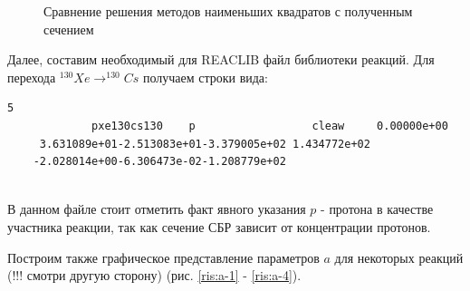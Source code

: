 \documentclass[%
master,    %
natbib,      %
subf,        %
href,        %
colorlinks,  %
]{disser}
\begin{document}
\begin{figure}[h]
	\caption{Сравнение решения методов наименьших квадратов с полученным сечением}
	\label{ris:2}
\end{figure}

Далее, составим необходимый для REACLIB файл библиотеки реакций. Для перехода $^{130}Xe \to ^{130}Cs$ получаем строки вида: 

\begin{lstlisting}[label={lst:label}]
	5
	         pxe130cs130    p                  cleaw     0.00000e+00          
	 3.631089e+01-2.513083e+01-3.379005e+02 1.434772e+02                      
	-2.028014e+00-6.306473e-02-1.208779e+02                                   
	
\end{lstlisting}

В данном файле стоит отметить факт явного указания $p$ - протона в качестве участника реакции, так как сечение СБР зависит от концентрации протонов. 

Построим также графическое представление параметров $a$ для некоторых реакций (!!! смотри другую сторону) (рис. \ref{ris:a-1} - \ref{ris:a-4}).
\end{document}
